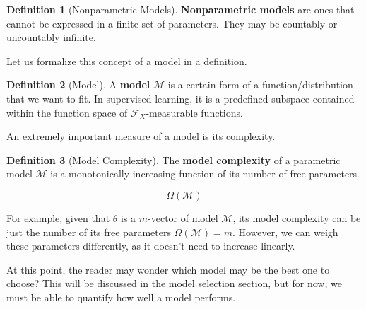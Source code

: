 \documentclass{article}
\theoremstyle{definition}
\newtheorem{definition}{Definition}[section]
\begin{document}
    \begin{definition}[Nonparametric Models]
      \textbf{Nonparametric models} are ones that cannot be expressed in a finite set of parameters. They may be countably or uncountably infinite. 
    \end{definition}

    Let us formalize this concept of a model in a definition. 

    \begin{definition}[Model]
      A \textbf{model} $\mathcal{M}$ is a certain form of a function/distribution that we want to fit. In supervised learning, it is a predefined subspace contained within the function space of $\mathcal{F}_X$-measurable functions. 
    \end{definition}

    An extremely important measure of a model is its complexity. 

    \begin{definition}[Model Complexity]
      The \textbf{model complexity} of a parametric model $\mathcal{M}$ is a monotonically increasing function of its number of free parameters. 

        \[\Omega(\mathcal{M})\]

      For example, given that $\theta$ is a $m$-vector of model $\mathcal{M}$, its model complexity can be just the number of its free parameters $\Omega(\mathcal{M}) = m$. However, we can weigh these parameters differently, as it doesn't need to increase linearly. 
    \end{definition}

    At this point, the reader may wonder which model may be the best one to choose? This will be discussed in the model selection section, but for now, we must be able to quantify how well a model performs. 
\end{document}
